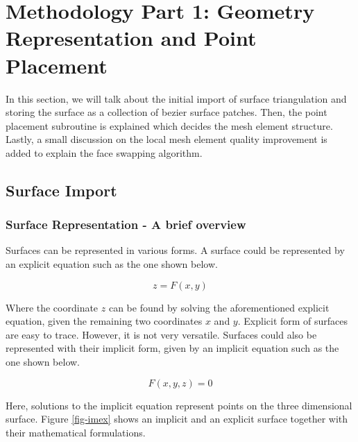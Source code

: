 \chapter{Methodology Part 1: Geometry Representation and Point Placement}

In this section, we will talk about the initial import of surface triangulation and storing the surface as a collection of bezier surface patches. Then, the point placement subroutine is explained which decides the mesh element structure. Lastly, a small discussion on the local mesh element quality improvement is added to explain the face swapping algorithm. 

\section{Surface Import}

\subsection{Surface Representation - A brief overview}

Surfaces can be represented in various forms. A surface could be represented by an explicit equation such as the one shown below.

\begin{equation}
z = F(x,y)
\end{equation}

Where the coordinate $z$ can be found by solving the aforementioned explicit equation, given the remaining two coordinates $x$ and $y$.  Explicit form of surfaces are easy to trace. However, it is not very versatile. Surfaces could also be represented with their implicit form, given by an implicit equation such as the one shown below.

\begin{equation}
F(x, y, z) = 0
\end{equation}

Here, solutions to the implicit equation represent points on the three dimensional surface. Figure \ref{fig-imex} shows an implicit and an explicit surface together with their mathematical formulations.

